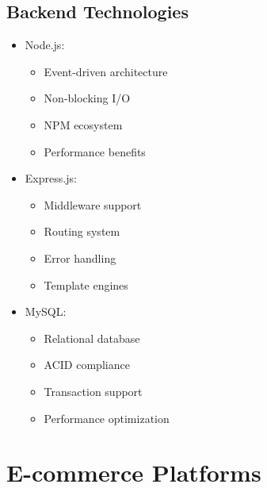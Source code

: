 \subsection{Backend Technologies}
\begin{itemize}
    \item Node.js:
    \begin{itemize}
        \item Event-driven architecture
        \item Non-blocking I/O
        \item NPM ecosystem
        \item Performance benefits
    \end{itemize}
    \item Express.js:
    \begin{itemize}
        \item Middleware support
        \item Routing system
        \item Error handling
        \item Template engines
    \end{itemize}
    \item MySQL:
    \begin{itemize}
        \item Relational database
        \item ACID compliance
        \item Transaction support
        \item Performance optimization
    \end{itemize}
\end{itemize}

\section{E-commerce Platforms}
